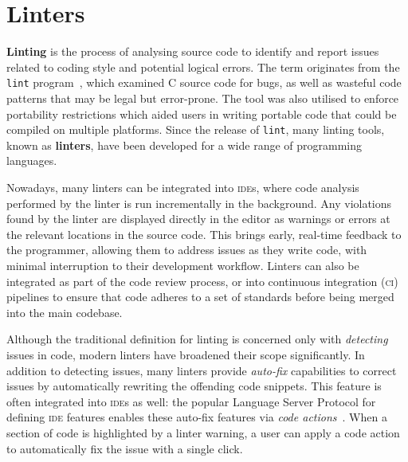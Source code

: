 \documentclass[../../main.tex]{subfiles}
\begin{document}
\section{Linters}\label{sec:background-linters}
\textbf{Linting} is the process of analysing source code to identify and report issues related to coding style and potential logical errors.
The term originates from the \texttt{lint} program~\cite{johnson_lint_1978}, which examined C source code for bugs, as well as wasteful code patterns that may be legal but error-prone.
The tool was also utilised to enforce portability restrictions which aided users in writing portable code that could be compiled on multiple platforms.
Since the release of \texttt{lint}, many linting tools, known as \textbf{linters}, have been developed for a wide range of programming languages.

Nowadays, many linters can be integrated into \textsc{ide}s, where code analysis performed by the linter is run incrementally in the background.
Any violations found by the linter are displayed directly in the editor as warnings or errors at the relevant locations in the source code.
This brings early, real-time feedback to the programmer, allowing them to address issues as they write code, with minimal interruption to their development workflow.
Linters can also be integrated as part of the code review process, or into continuous integration (\textsc{ci}) pipelines to ensure that code adheres to a set of standards before being merged into the main codebase.

Although the traditional definition for linting is concerned only with \emph{detecting} issues in code, modern linters have broadened their scope significantly.
In addition to detecting issues, many linters provide \emph{auto-fix} capabilities to correct issues by automatically rewriting the offending code snippets.
This feature is often integrated into \textsc{ide}s as well: the popular Language Server Protocol for defining \textsc{ide} features enables these auto-fix features via \emph{code actions}~\cite{gunasinghe_lsp_2022}.
When a section of code is highlighted by a linter warning, a user can apply a code action to automatically fix the issue with a single click.

\end{document}

